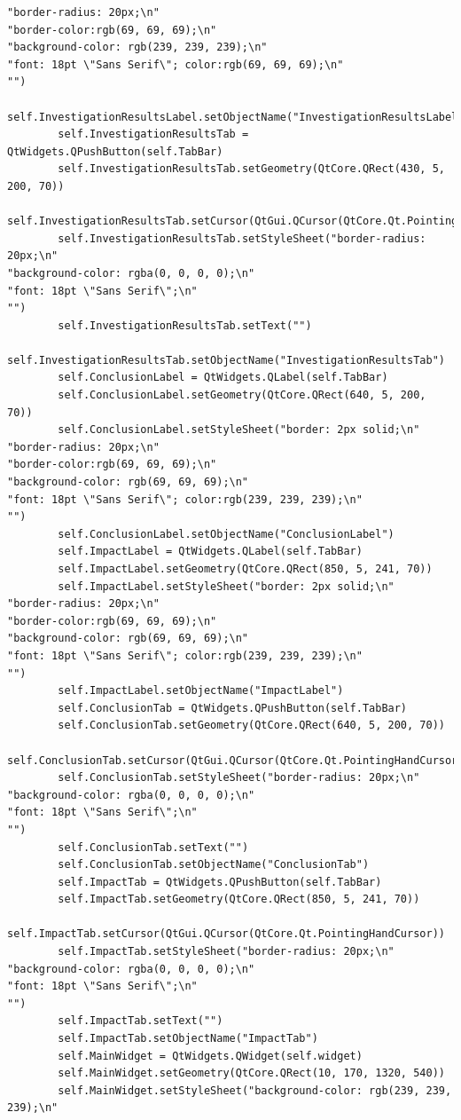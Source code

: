 \documentclass{article}
\begin{document}
\begin{lstlisting}
"border-radius: 20px;\n"
"border-color:rgb(69, 69, 69);\n"
"background-color: rgb(239, 239, 239);\n"
"font: 18pt \"Sans Serif\"; color:rgb(69, 69, 69);\n"
"")
        self.InvestigationResultsLabel.setObjectName("InvestigationResultsLabel")
        self.InvestigationResultsTab = QtWidgets.QPushButton(self.TabBar)
        self.InvestigationResultsTab.setGeometry(QtCore.QRect(430, 5, 200, 70))
        self.InvestigationResultsTab.setCursor(QtGui.QCursor(QtCore.Qt.PointingHandCursor))
        self.InvestigationResultsTab.setStyleSheet("border-radius: 20px;\n"
"background-color: rgba(0, 0, 0, 0);\n"
"font: 18pt \"Sans Serif\";\n"
"")
        self.InvestigationResultsTab.setText("")
        self.InvestigationResultsTab.setObjectName("InvestigationResultsTab")
        self.ConclusionLabel = QtWidgets.QLabel(self.TabBar)
        self.ConclusionLabel.setGeometry(QtCore.QRect(640, 5, 200, 70))
        self.ConclusionLabel.setStyleSheet("border: 2px solid;\n"
"border-radius: 20px;\n"
"border-color:rgb(69, 69, 69);\n"
"background-color: rgb(69, 69, 69);\n"
"font: 18pt \"Sans Serif\"; color:rgb(239, 239, 239);\n"
"")
        self.ConclusionLabel.setObjectName("ConclusionLabel")
        self.ImpactLabel = QtWidgets.QLabel(self.TabBar)
        self.ImpactLabel.setGeometry(QtCore.QRect(850, 5, 241, 70))
        self.ImpactLabel.setStyleSheet("border: 2px solid;\n"
"border-radius: 20px;\n"
"border-color:rgb(69, 69, 69);\n"
"background-color: rgb(69, 69, 69);\n"
"font: 18pt \"Sans Serif\"; color:rgb(239, 239, 239);\n"
"")
        self.ImpactLabel.setObjectName("ImpactLabel")
        self.ConclusionTab = QtWidgets.QPushButton(self.TabBar)
        self.ConclusionTab.setGeometry(QtCore.QRect(640, 5, 200, 70))
        self.ConclusionTab.setCursor(QtGui.QCursor(QtCore.Qt.PointingHandCursor))
        self.ConclusionTab.setStyleSheet("border-radius: 20px;\n"
"background-color: rgba(0, 0, 0, 0);\n"
"font: 18pt \"Sans Serif\";\n"
"")
        self.ConclusionTab.setText("")
        self.ConclusionTab.setObjectName("ConclusionTab")
        self.ImpactTab = QtWidgets.QPushButton(self.TabBar)
        self.ImpactTab.setGeometry(QtCore.QRect(850, 5, 241, 70))
        self.ImpactTab.setCursor(QtGui.QCursor(QtCore.Qt.PointingHandCursor))
        self.ImpactTab.setStyleSheet("border-radius: 20px;\n"
"background-color: rgba(0, 0, 0, 0);\n"
"font: 18pt \"Sans Serif\";\n"
"")
        self.ImpactTab.setText("")
        self.ImpactTab.setObjectName("ImpactTab")
        self.MainWidget = QtWidgets.QWidget(self.widget)
        self.MainWidget.setGeometry(QtCore.QRect(10, 170, 1320, 540))
        self.MainWidget.setStyleSheet("background-color: rgb(239, 239, 239);\n"

\end{lstlisting}
\end{document}
